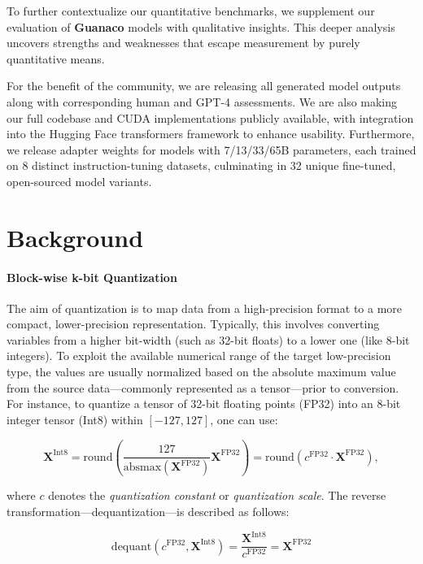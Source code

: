 To further contextualize our quantitative benchmarks, we supplement our evaluation of \textbf{Guanaco} models with qualitative insights. This deeper analysis uncovers strengths and weaknesses that escape measurement by purely quantitative means.

For the benefit of the community, we are releasing all generated model outputs along with corresponding human and GPT-4 assessments. We are also making our full codebase and CUDA implementations publicly available, with integration into the Hugging Face transformers framework \citep{wolf2019huggingface} to enhance usability. Furthermore, we release adapter weights for models with 7/13/33/65B parameters, each trained on 8 distinct instruction-tuning datasets, culminating in 32 unique fine-tuned, open-sourced model variants.

\section{Background}
\paragraph{Block-wise k-bit Quantization} The aim of quantization is to map data from a high-precision format to a more compact, lower-precision representation. Typically, this involves converting variables from a higher bit-width (such as 32-bit floats) to a lower one (like 8-bit integers). To exploit the available numerical range of the target low-precision type, the values are usually normalized based on the absolute maximum value from the source data—commonly represented as a tensor—prior to conversion. For instance, to quantize a tensor of 32-bit floating points (FP32) into an 8-bit integer tensor (Int8) within $[-127, 127]$, one can use:

\begin{equation}
    \mathbf{X}^{ \text{Int8}} = \text{round}\left( \frac{127}{{\text{absmax}}(\mathbf{X}^{{\text{FP32}}})}\mathbf{X}^{{\text{FP32}}} \right) = \text{round}(c^{\text{FP32}}\cdot \mathbf{X}^{{\text{FP32}}}),
\end{equation}

where $c$ denotes the {\em quantization constant} or {\em quantization scale}. The reverse transformation—dequantization—is described as follows:

\begin{equation}
    \text{dequant}(c^{\text{FP32}}, \mathbf{X}^{\text{Int8}}) = \frac{\mathbf{X}^{\text{Int8}}}{c^{\text{FP32}}} = \mathbf{X}^{\text{FP32}}
\end{equation}

